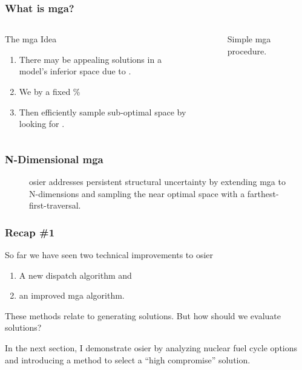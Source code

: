 \begin{frame}
    \frametitle{What is \gls{mga}?}

    \begin{columns}
        \column[t]{3.5cm}
        \begin{block}{The \gls{mga} Idea}
            \begin{enumerate}[<+->]
                \item There may be appealing solutions in a model's inferior
                space due to .
                \item We  by a fixed \% 
                \item Then efficiently sample sub-optimal space by looking for
                 \cite{decarolis_using_2011}.
            \end{enumerate}    
        \end{block}
    \column[t]{7cm}
        \begin{figure}
            \centering
            \resizebox{\columnwidth}{!}{}
            \caption{Simple \gls{mga} procedure.}
        \end{figure}
    \end{columns}
\end{frame}

\begin{frame}
    \frametitle{N-Dimensional \gls{mga}}
    \begin{figure}
        \centering
        \resizebox{\columnwidth}{!}{}
        \caption{\gls{osier} addresses persistent structural uncertainty by
        extending \gls{mga} to N-dimensions and sampling the near optimal space
        with a farthest-first-traversal.}
    \end{figure}
\end{frame}


\begin{frame}
    \frametitle{Recap \#1}

    So far we have seen two technical improvements to \gls{osier}

    \begin{enumerate}
        \item A new dispatch algorithm and
        \item an improved \gls{mga} algorithm.
    \end{enumerate}

    These methods relate to generating solutions. But how should we evaluate 
    solutions?
    
    In the next section, I demonstrate \gls{osier} by analyzing nuclear fuel cycle options
    and introducing a method to select a ``high compromise'' solution.
\end{frame}